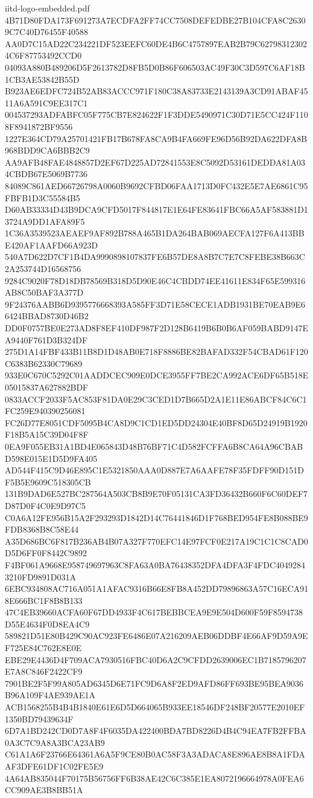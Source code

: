 \begin{filecontents*}[overwrite]{iitd-logo-embedded.pdf}
4B71D80FDA173F691273A7ECDFA2FF74CC7508DEFEDBE27B104CFA8C26309C7C40D76455F40588
AA0D7C15AD22C234221DF523EEFC60DE4B6C4757897EAB2B79C627983123024C6F87753492CCD0
04093A880B489206D5F2613782D8FB5D0B86F606503AC49F30C3D597C6AF18B1CB3AE53842B55D
B923AE6EDFC724B52AB83ACCC971F180C38A83733E2143139A3CD91ABAF4511A6A591C9EE317C1
004537293ADFABFC05F775CB7E824622F1F3DDE5490971C30D71E5CC424F1108F8941872BF9556
1227E364CD79A25701421FB17B678FA8CA9B4FA669FE96D56B92DA622DFA8B968BDD9CA6BBB2C9
AA9AFB48FAE4848857D2EF67D225AD72841553E8C5092D53161DEDDA81A034CBDB67E5069B7736
84089C861AED66726798A0060B9692CFBD06FAA1713D0FC432E5E7AE6861C95FBFB1D3C55584B5
D60AB33334D43B9DCA9CFD5017F844817E1E64FE83641FBC66A5AF583881D13724A9DD1AFA89F5
1C36A3539523AEAEF9AF892B788A465B1DA264BAB069AECFA127F6A413BBE420AF1AAFD66A923D
540A7D622D7CF1B4DA9990898107837FE6B57DE8A8B7C7E7C8FEBE38B663C2A253744D16568756
9284C9020F78D18DB78569B318D5D90E46C4CBDD74EE41611E834F65E599316AB8C50BAF3A377D
9F24376AABB6D9395776668393A585FF3D71E58CECE1ADB1931BE70EAB9E66424BBAD8730D46B2
DD0F0757BE0E273AD8F8EF410DF987F2D128B6419B6B0B6AF059BABD9147EA9440F761D3B324DF
275D1A14FBF433B11B8D1D48AB0E718F8886BE82BAFAD332F54CBAD61F120C6383B62330C79689
933E0C670C5292C01AADDCEC909E0DCE3955FF7BE2CA992ACE6DF65B518E05015837A627882BDF
0833ACCF2033F5AC853F81DA0E29C3CED1D7B665D2A1E11E86ABCF84C6C1FC259E940390256081
FC26D77E8051CDF5095B4CA8D9C1CD1ED5DD24304E40BF8D65D24919B1920F18B5A15C39D04F8F
0EA9F055EB31A1BD4E065843D48B76BF71C4D582FCFFA6B8CA64A96CBABD598E015E1D5D9FA405
AD544F415C9D46E895C1E5321850AAA0D887E7A6AAFE78F35FDFF90D151DF5B5E9609C518305CB
131B9DAD6E527BC287564A503CB8B9E70F05131CA3FD36432B660F6C60DEF7D87D0F4C0E9D97C5
C0A6A12FE956B15A2F293293D1842D14C76441846D1F768BED954FE8B088BE9FDB8368B8C58E44
A35D686BC6F817B236AB4B07A327F770EFC14E97FCF0E217A19C1C1C8CAD0D5D6FF0F8442C9892
F4BF061A9668E958749697963C8FA63A0BA76438352DFA4DFA3F4FDC40492843210FD9891D031A
6EBC934808AC716A051A1AFAC9316B66E8FB8A452DD79896863A57C16ECA918E666BC1F8B8B133
47C4EB39660ACFA60F67DD4933F4C617BEBBCEA9E9E504D600F59F8594738D55E4634F0D8EA4C9
589821D51E80B429C90AC923FE6486E07A216209AEB06DDBF4E66AF9D59A9EF725E84C762E8E0E
EBE29E4436D4F709ACA7930516FBC40D6A2C9CFDD2639006EC1B7185796207E7A8C846F2422CF9
7901BE2F5F99A805AD6345D6E71FC9D6A8F2ED9AFD86FF693BE95BEA9036B96A109F4AE939AE1A
ACB1568255B4B4B1840E61E6D5D664065B933EE18546DF248BF20577E2010EF1350BD79439634F
6D7A1BD242CD0D7A8F4F6035DA422400BDA7BD8226D4B4C94EA7FB2FFBA0A3C7C9A8A3BCA23AB9
C61A1A6F23766E64361A6A5F9CE80B0AC58F3A3ADACA8E896AE8B8A1FDAAF3DFE61DF1C02FE5E9
4A64AB835044F70175B56756FF6B38AE42C6C385E1EA8072196664978A0FEA6CC909AE3B8BB51A

\end{filecontents*}
